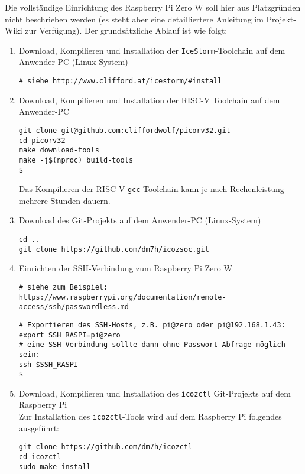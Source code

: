 Die vollständige Einrichtung des Raspberry Pi Zero W soll hier aus Platzgründen nicht beschrieben werden (es steht aber eine detailliertere Anleitung im Projekt-Wiki zur Verfügung).
Der grundsätzliche Ablauf ist wie folgt:
\begin{enumerate}

\item Download, Kompilieren und Installation der {\tt IceStorm}-Toolchain auf dem Anwender-PC (Linux-System)

\begin{verbatim}
# siehe http://www.clifford.at/icestorm/#install
\end{verbatim}

\item Download, Kompilieren und Installation der RISC-V Toolchain auf dem Anwender-PC

\begin{verbatim}
git clone git@github.com:cliffordwolf/picorv32.git
cd picorv32
make download-tools
make -j$(nproc) build-tools                                                                 $
\end{verbatim}

Das Kompilieren der RISC-V {\tt gcc}-Toolchain kann je nach Rechenleistung mehrere Stunden dauern.

\item Download des Git-Projekts auf dem Anwender-PC (Linux-System)

\begin{verbatim}
cd ..
git clone https://github.com/dm7h/icozsoc.git
\end{verbatim}


\item Einrichten der SSH-Verbindung zum Raspberry Pi Zero W 

\begin{verbatim}
# siehe zum Beispiel: https://www.raspberrypi.org/documentation/remote-access/ssh/passwordless.md
\end{verbatim}
\begin{verbatim}
# Exportieren des SSH-Hosts, z.B. pi@zero oder pi@192.168.1.43:
export SSH_RASPI=pi@zero
# eine SSH-Verbindung sollte dann ohne Passwort-Abfrage möglich sein:
ssh $SSH_RASPI                                                                               $
\end{verbatim}

\item Download, Kompilieren und Installation des {\tt icozctl} Git-Projekts auf dem Raspberry Pi\\ 
Zur Installation des {\tt icozctl}-Tools wird auf dem Raspberry Pi folgendes ausgeführt:
\begin{verbatim}
git clone https://github.com/dm7h/icozctl
cd icozctl
sudo make install
\end{verbatim}


\end{enumerate}
